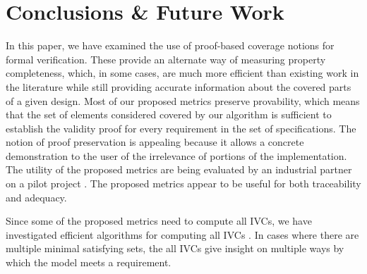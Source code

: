 \section{Conclusions \& Future Work}
\label{sec:conclusion}

In this paper, we have examined the use of proof-based coverage notions for formal verification.  These provide an alternate way of measuring property completeness, which, 
in some cases, are much more efficient than existing work in the literature while still providing accurate information about the covered parts of a given design.
Most of our proposed metrics preserve provability, which means that the set of elements considered covered by our algorithm is sufficient to establish the validity proof for every requirement in the set of specifications.
The notion of proof preservation is appealing because it allows a concrete demonstration to the user of the irrelevance of portions of the implementation. The utility of the proposed metrics are being evaluated by
an industrial partner on a pilot project \cite{fillin} . The proposed metrics
appear to be useful for both traceability and adequacy.

Since some of the proposed metrics need to compute all IVCs,
we have investigated efficient algorithms for computing all IVCs \cite{Ghass17}. In cases where there are multiple minimal satisfying sets, the all IVCs give insight on multiple ways by which the model meets a requirement.


